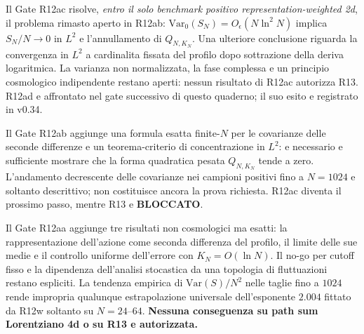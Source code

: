 \documentclass[11pt,a4paper]{article}
\begin{document}
Il Gate R12ac risolve, \emph{entro il solo benchmark positivo representation-weighted 2d}, il problema rimasto aperto in R12ab: $\mathrm{Var}_0(S_N)=O_\epsilon(N\ln^2N)$ implica $S_N/N\to0$ in $L^2$ e l'annullamento di $Q_{N,K_N}$. Una ulteriore conclusione riguarda la convergenza in $L^2$ a cardinalita fissata del profilo dopo sottrazione della deriva logaritmica. La varianza non normalizzata, la fase complessa e un principio cosmologico indipendente restano aperti: nessun risultato di R12ac autorizza R13. R12ad e affrontato nel gate successivo di questo quaderno; il suo esito e registrato in v0.34.\par\medskip



Il Gate R12ab aggiunge una formula esatta finite-$N$ per le covarianze delle seconde differenze e un teorema-criterio di concentrazione in $L^2$: e necessario e sufficiente mostrare che la forma quadratica pesata $Q_{N,K_N}$ tende a zero. L'andamento decrescente delle covarianze nei campioni positivi fino a $N=1024$ e soltanto descrittivo; non costituisce ancora la prova richiesta. R12ac diventa il prossimo passo, mentre R13 e \textbf{BLOCCATO}.\par\medskip

Il Gate R12aa aggiunge tre risultati non cosmologici ma esatti: la rappresentazione dell'azione come seconda differenza del profilo, il limite delle sue medie e il controllo uniforme dell'errore con $K_N=O(\ln N)$. Il no-go per cutoff fisso e la dipendenza dell'analisi stocastica da una topologia di fluttuazioni restano espliciti. La tendenza empirica di $\mathrm{Var}(S)/N^2$ nelle taglie fino a $1024$ rende impropria qualunque estrapolazione universale dell'esponente $2.004$ fittato da R12w soltanto su $N=24$--$64$. \textbf{Nessuna conseguenza su path sum Lorentziano 4d o su R13 e autorizzata.}
\end{document}
